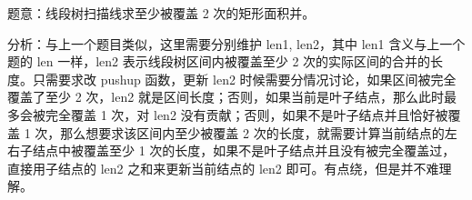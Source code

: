 题意：线段树扫描线求至少被覆盖 2 次的矩形面积并。

分析：与上一个题目类似，这里需要分别维护 len1, len2，其中 len1 含义与上一个题的 len 一样，len2 表示线段树区间内被覆盖至少 2 次的实际区间的合并的长度。只需要求改 pushup 函数，更新 len2 时候需要分情况讨论，如果区间被完全覆盖了至少 2 次，len2 就是区间长度；否则，如果当前是叶子结点，那么此时最多会被完全覆盖 1 次，对 len2 没有贡献；否则，如果不是叶子结点并且恰好被覆盖 1 次，那么想要求该区间内至少被覆盖 2 次的长度，就需要计算当前结点的左右子结点中被覆盖至少 1 次的长度，如果不是叶子结点并且没有被完全覆盖过，直接用子结点的 len2 之和来更新当前结点的 len2 即可。有点绕，但是并不难理解。